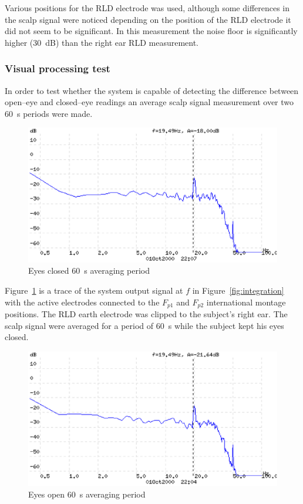 Various positions for the RLD electrode was used, although some
differences in the scalp signal were noticed depending on the position
of the RLD electrode it did not seem to be significant. In this
measurement the noise floor is significantly higher (30~dB) than the
right ear RLD measurement.

\subsubsection{Visual processing test}
In order to test whether the system is capable of detecting the
difference between open--eye and closed--eye readings an average scalp
signal measurement over two 60~s periods were made.


\begin{figure}[htbp]
\begin{center}
	\includegraphics[width=\textwidth]{EEGAV3TOE.ps} 
	\caption{Eyes closed 60~s averaging period}
    \label{fig:EEGAV3TOE}
\end{center}
\end{figure}

Figure~\ref{fig:EEGAV3TOE} is a trace of the system output signal at
$f$ in Figure~\ref{fig:integration} with the active electrodes
connected to the $F_{p1}$ and $F_{p2}$ international montage
positions. The RLD earth electrode was clipped to the subject's right
ear. The scalp signal were averaged for a period of 60~s while the
subject kept his eyes closed.


\begin{figure}[htbp]
\begin{center}
	\includegraphics[width=\textwidth]{EEGAV3OOP.ps} 
	\caption{Eyes open 60~s averaging period}
    \label{fig:EEGAVOOP}
\end{center}
\end{figure}

